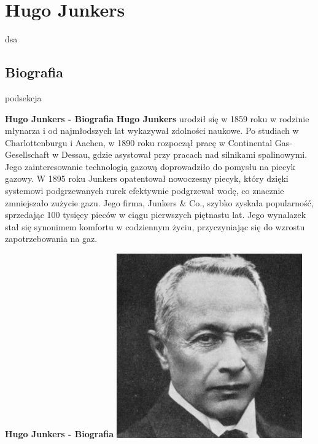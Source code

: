 
\section{ \textbf{Hugo Junkers}}

dsa

\subsection{Biografia}

podsekcja

\begin{frame}{\textbf{Hugo Junkers - Biografia}}
\textbf{Hugo Junkers} urodził się w 1859 roku w rodzinie młynarza i od najmłodszych lat wykazywał zdolności naukowe. Po studiach w Charlottenburgu i Aachen, w 1890 roku rozpoczął pracę w Continental Gas-Gesellschaft w Dessau, gdzie asystował przy pracach nad silnikami spalinowymi. Jego zainteresowanie technologią gazową doprowadziło do pomysłu na piecyk gazowy.
W 1895 roku Junkers opatentował nowoczesny piecyk, który dzięki systemowi podgrzewanych rurek efektywnie podgrzewał wodę, co znacznie zmniejszało zużycie gazu. Jego firma, Junkers \& Co., szybko zyskała popularność, sprzedając 100 tysięcy pieców w ciągu pierwszych piętnastu lat. Jego wynalazek stał się synonimem komfortu w codziennym życiu, przyczyniając się do wzrostu zapotrzebowania na gaz.
\end{frame}

\begin{frame}{\textbf{Hugo Junkers - Biografia}}
\includegraphics[width=8cm]{images/hugo-01.jpg}
\end{frame}

